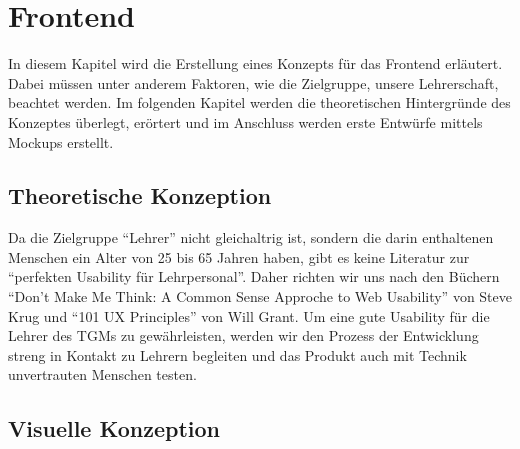 \section{Frontend}
\label{chapter:konzept-frontend}
In diesem Kapitel wird die Erstellung eines Konzepts für das Frontend erläutert. Dabei müssen unter anderem Faktoren, wie die Zielgruppe, unsere Lehrerschaft, beachtet werden. Im folgenden Kapitel werden die theoretischen Hintergründe des Konzeptes überlegt, erörtert und im Anschluss werden erste Entwürfe mittels Mockups erstellt. 
\subsection{Theoretische Konzeption}
\label{chapter:konzept-frontend-theorie}
Da die Zielgruppe \enquote{Lehrer} nicht gleichaltrig ist, sondern die darin enthaltenen Menschen ein Alter von 25 bis 65 Jahren haben, gibt es keine Literatur zur \enquote{perfekten Usability für Lehrpersonal}. Daher richten wir uns nach den Büchern \enquote{Don't Make Me Think: A Common Sense Approche to Web Usability} von Steve Krug und  \enquote{101 UX Principles} von Will Grant. Um eine gute Usability für die Lehrer des TGMs zu gewährleisten, werden wir den Prozess der Entwicklung streng in Kontakt zu Lehrern begleiten und das Produkt auch mit Technik unvertrauten Menschen testen.  
\newpage
\subsection{Visuelle Konzeption}
\label{chapter:konzept-frontend-visuell}
